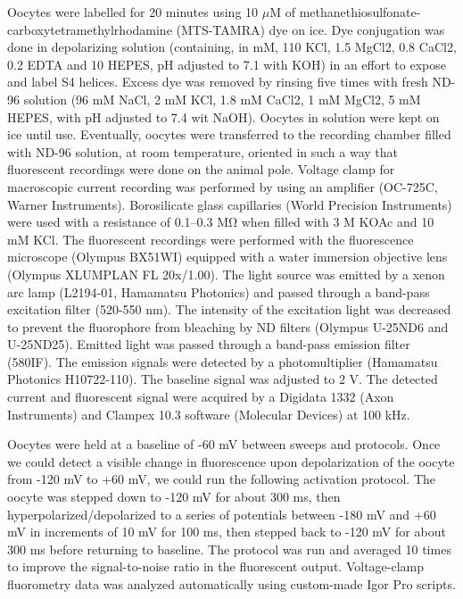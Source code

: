 Oocytes were labelled for 20 minutes using 10 $\mu$M of methanethiosulfonate-carboxy\-tetra\-methyl\-rhodamine (MTS-TAMRA) dye on ice. Dye conjugation was done in depolarizing solution (containing, in mM, 110 KCl, 1.5 MgCl2, 0.8 CaCl2, 0.2 EDTA and 10 HEPES, pH adjusted to 7.1 with KOH) in an effort to expose and label S4 helices. Excess dye was removed by rinsing five times with fresh ND-96 solution (96 mM NaCl, 2 mM KCl, 1.8 mM CaCl2, 1 mM MgCl2, 5 mM HEPES, with pH adjusted to 7.4 wit NaOH). Oocytes in solution were kept on ice until use. Eventually, oocytes were transferred to the recording chamber filled with ND-96 solution, at room temperature, oriented in such a way that fluorescent recordings were done on the animal pole. Voltage clamp for macroscopic current recording was performed by using an amplifier (OC-725C, Warner Instruments). Borosilicate glass capillaries (World Precision Instruments) were used with a resistance of 0.1–0.3 MΩ when filled with 3 M KOAc and 10 mM KCl. The fluorescent recordings were performed with the fluorescence microscope (Olympus BX51WI) equipped with a water immersion objective lens (Olympus XLUMPLAN FL 20x/1.00). The light source was emitted by a xenon arc lamp (L2194-01, Hamamatsu Photonics) and passed through a band-pass excitation filter (520-550 nm). The intensity of the excitation light was decreased to prevent the fluorophore from bleaching by ND filters (Olympus U-25ND6 and U-25ND25). Emitted light was passed through a band-pass emission filter (580IF). The emission signals were detected by a photomultiplier (Hamamatsu Photonics H10722-110). The baseline signal was adjusted to 2 V. The detected current and fluorescent signal were acquired by a Digidata 1332 (Axon Instruments) and Clampex 10.3 software (Molecular Devices) at 100 kHz.

Oocytes were held at a baseline of -60 mV between sweeps and protocols. Once we could detect a visible change in fluorescence upon depolarization of the oocyte from -120 mV to +60 mV, we could run the following activation protocol. The oocyte was stepped down to -120 mV for about 300 ms, then hyperpolarized/depolarized to a series of potentials between -180 mV and +60 mV in increments of 10 mV for 100 ms, then stepped back to -120 mV for about 300 ms before returning to baseline. The protocol was run and averaged 10 times to improve the signal-to-noise ratio in the fluorescent output. Voltage-clamp fluorometry data was analyzed automatically using custom-made Igor Pro scripts.

